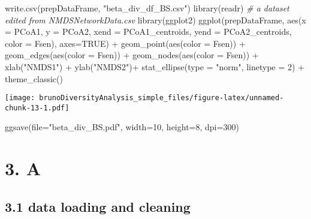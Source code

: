 \documentclass[
]{article}
\newenvironment{Shaded}{\begin{snugshade}}{\end{snugshade}}
\newcommand{\AttributeTok}[1]{\textcolor[rgb]{0.77,0.63,0.00}{#1}}
\newcommand{\CommentTok}[1]{\textcolor[rgb]{0.56,0.35,0.01}{\textit{#1}}}
\newcommand{\ConstantTok}[1]{\textcolor[rgb]{0.00,0.00,0.00}{#1}}
\newcommand{\DecValTok}[1]{\textcolor[rgb]{0.00,0.00,0.81}{#1}}
\newcommand{\FunctionTok}[1]{\textcolor[rgb]{0.00,0.00,0.00}{#1}}
\newcommand{\NormalTok}[1]{#1}
\newcommand{\SpecialCharTok}[1]{\textcolor[rgb]{0.00,0.00,0.00}{#1}}
\newcommand{\StringTok}[1]{\textcolor[rgb]{0.31,0.60,0.02}{#1}}
\begin{document}
\begin{Shaded}
\begin{Highlighting}[]
\FunctionTok{write.csv}\NormalTok{(prepDataFrame, }\StringTok{"beta\_div\_df\_BS.csv"}\NormalTok{)}
\FunctionTok{library}\NormalTok{(readr)}
\CommentTok{\# a dataset edited from NMDSNetworkData.csv}
\FunctionTok{library}\NormalTok{(ggplot2)}
\FunctionTok{ggplot}\NormalTok{(prepDataFrame, }\FunctionTok{aes}\NormalTok{(}\AttributeTok{x =}\NormalTok{ PCoA1, }\AttributeTok{y =}\NormalTok{ PCoA2, }\AttributeTok{xend =}\NormalTok{ PCoA1\_centroids, }\AttributeTok{yend =}\NormalTok{ PCoA2\_centroids, }\AttributeTok{color =}\NormalTok{ Fsen), }\AttributeTok{axes=}\ConstantTok{TRUE}\NormalTok{) }\SpecialCharTok{+}
  \FunctionTok{geom\_point}\NormalTok{(}\FunctionTok{aes}\NormalTok{(}\AttributeTok{color =}\NormalTok{ Fsen)) }\SpecialCharTok{+}
  \FunctionTok{geom\_edges}\NormalTok{(}\FunctionTok{aes}\NormalTok{(}\AttributeTok{color =}\NormalTok{ Fsen)) }\SpecialCharTok{+}
  \FunctionTok{geom\_nodes}\NormalTok{(}\FunctionTok{aes}\NormalTok{(}\AttributeTok{color =}\NormalTok{ Fsen)) }\SpecialCharTok{+}
  \FunctionTok{xlab}\NormalTok{(}\StringTok{"NMDS1"}\NormalTok{) }\SpecialCharTok{+}
  \FunctionTok{ylab}\NormalTok{(}\StringTok{"NMDS2"}\NormalTok{)}\SpecialCharTok{+}
  \FunctionTok{stat\_ellipse}\NormalTok{(}\AttributeTok{type =} \StringTok{"norm"}\NormalTok{, }\AttributeTok{linetype =} \DecValTok{2}\NormalTok{) }\SpecialCharTok{+}
  \FunctionTok{theme\_classic}\NormalTok{()}
\end{Highlighting}
\end{Shaded}

\texttt{[image: brunoDiversityAnalysis\_simple\_files/figure-latex/unnamed-chunk-13-1.pdf]}

\begin{Shaded}
\begin{Highlighting}[]
\FunctionTok{ggsave}\NormalTok{(}\AttributeTok{file=}\StringTok{"beta\_div\_BS.pdf"}\NormalTok{, }\AttributeTok{width=}\DecValTok{10}\NormalTok{, }\AttributeTok{height=}\DecValTok{8}\NormalTok{, }\AttributeTok{dpi=}\DecValTok{300}\NormalTok{)}
\end{Highlighting}
\end{Shaded}

\hypertarget{a}{%
\section{3. A}\label{a}}

\hypertarget{data-loading-and-cleaning-2}{%
\subsection{3.1 data loading and
cleaning}\label{data-loading-and-cleaning-2}}
\end{document}

